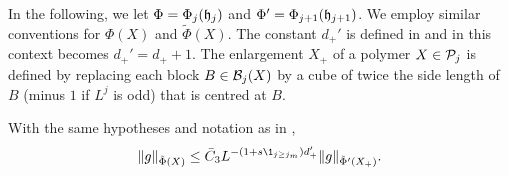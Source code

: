 In the following, we let $\Phi = \Phi_j(\mathfrak{h}_j)$ and $\Phi' = \Phi_{j+1}(\mathfrak{h}_{j+1})$.
We employ similar conventions for $\Phi(X)$ and $\tilde\Phi(X)$. The constant $d_+'$
is defined in \cite[\eqref{loc-e:dplusprimedef}]{BS-rg-loc} and in this context becomes
$d_+' = d_+ + 1$. The enlargement $X_+$ of a polymer $X\in\mathcal{P}_j$ is defined by replacing
each block $B\in\mathcal{B}_j(X)$ by a cube of twice the side length of $B$ (minus $1$ if $L^j$
is odd) that is centred at $B$.

\begin{lemma}
\label{lem:phiij-improved}
With the same hypotheses and notation as in \cite[Lemma~\ref{loc-lem:phij}]{BS-rg-loc},
\begin{equation}
\lbeq{gbd-improved}
\|g\|_{\tilde{\Phi} (X)}
\leq
\bar C_3
L^{- (1 + s \1_{j \geq j_m}) d_+'}  \|g\|_{\tilde{\Phi}' (X_+)}.
\end{equation}
\end{lemma}


